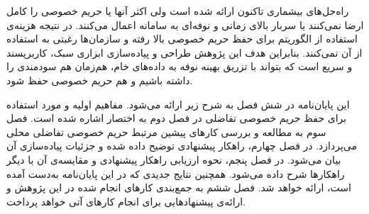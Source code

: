 
راه‌حل‌های بیشماری تاکنون ارائه شده‌ است ولی اکثر آنها یا حریم خصوصی را کامل ارضا نمی‌کنند یا سربار بالای زمانی و نوفه‌ای به سامانه اعمال می‌کنند. در نتیجه هزینه‌ی استفاده از الگوریتم برای حفظ حریم خصوصی بالا رفته و سازمان‌ها رغبتی به استفاده از آن نمی‌کنند. بنابراین هدف این پژوهش طراحی و پیاده‌سازی ابزاری سبک، کاربرپسند و سریع است که بتواند با تزریق بهینه نوفه به داده‌های خام، هم‌زمان هم سودمندی را داشته باشیم و هم حریم خصوصی حفظ شود.


این پایان‌نامه در شش فصل به شرح زیر ارائه می‌شود.
مفاهیم اولیه و مورد استفاده برای حفظ حریم خصوصی تفاضلی در فصل دوم به اختصار اشاره شده است. 
فصل سوم به مطالعه و بررسی کارهای پیشین مرتبط حریم خصوصی تفاضلی محلی می‌پردازد.
در فصل چهارم، راهکار پیشنهادی توضیح داده شده و جزئیات پیاده‌سازی آن بیان می‌شود.
در فصل پنجم، نحوه ارزیابی راهکار پیشنهادی و مقایسه‌ی آن با دیگر راهکارها شرح داده می‌شود. همچنین نتایج جدیدی که در این پایان‌نامه به‌دست آمده است، ارائه خواهد شد.
فصل ششم به جمع‌بندی کارهای انجام شده در این پژوهش و ارائه‌ی پیشنهادهایی برای انجام کارهای آتی خواهد پرداخت.